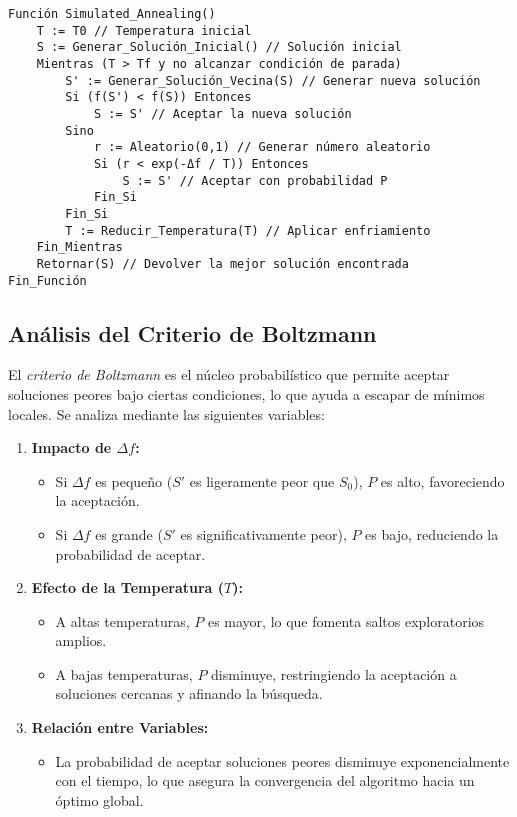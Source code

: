 \documentclass{article}
\begin{document}
\begin{verbatim}
Función Simulated_Annealing()
    T := T0 // Temperatura inicial
    S := Generar_Solución_Inicial() // Solución inicial
    Mientras (T > Tf y no alcanzar condición de parada)
        S' := Generar_Solución_Vecina(S) // Generar nueva solución
        Si (f(S') < f(S)) Entonces
            S := S' // Aceptar la nueva solución
        Sino
            r := Aleatorio(0,1) // Generar número aleatorio
            Si (r < exp(-Δf / T)) Entonces
                S := S' // Aceptar con probabilidad P
            Fin_Si
        Fin_Si
        T := Reducir_Temperatura(T) // Aplicar enfriamiento
    Fin_Mientras
    Retornar(S) // Devolver la mejor solución encontrada
Fin_Función
\end{verbatim}

\subsection{Análisis del Criterio de Boltzmann}

El \textit{criterio de Boltzmann} es el núcleo probabilístico que permite aceptar soluciones peores bajo ciertas condiciones, lo que ayuda a escapar de mínimos locales. Se analiza mediante las siguientes variables:

\begin{enumerate}
    \item \textbf{Impacto de $\Delta f$:}
    \begin{itemize}
        \item Si $\Delta f$ es pequeño ($S'$ es ligeramente peor que $S_0$), $P$ es alto, favoreciendo la aceptación.
        \item Si $\Delta f$ es grande ($S'$ es significativamente peor), $P$ es bajo, reduciendo la probabilidad de aceptar.
    \end{itemize}
    
    \item \textbf{Efecto de la Temperatura ($T$):}
    \begin{itemize}
        \item A altas temperaturas, $P$ es mayor, lo que fomenta saltos exploratorios amplios.
        \item A bajas temperaturas, $P$ disminuye, restringiendo la aceptación a soluciones cercanas y afinando la búsqueda.
    \end{itemize}
    
    \item \textbf{Relación entre Variables:}
    \begin{itemize}
        \item La probabilidad de aceptar soluciones peores disminuye exponencialmente con el tiempo, lo que asegura la convergencia del algoritmo hacia un óptimo global.
    \end{itemize}
\end{enumerate}
\end{document}

